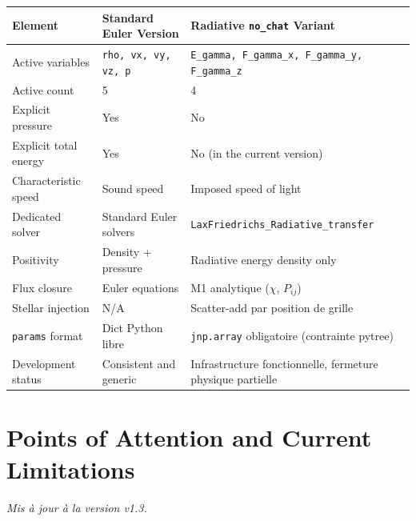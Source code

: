 \documentclass[a4paper, 11pt]{article}
\begin{document}
\begin{center}
\begin{tabular}{|l|l|l|}
\hline
\textbf{Element} & \textbf{Standard Euler Version} & \textbf{Radiative \texttt{no\_chat} Variant} \\
\hline
Active variables & \texttt{rho, vx, vy, vz, p} & \texttt{E\_gamma, F\_gamma\_x, F\_gamma\_y, F\_gamma\_z} \\
\hline
Active count & 5 & 4 \\
\hline
Explicit pressure & Yes & No \\
\hline
Explicit total energy & Yes & No (in the current version) \\
\hline
Characteristic speed & Sound speed & Imposed speed of light \\
\hline
Dedicated solver & Standard Euler solvers & \texttt{LaxFriedrichs\_Radiative\_transfer} \\
\hline
Positivity & Density + pressure & Radiative energy density only \\
\hline
Flux closure & Euler equations & M1 analytique ($\chi$, $P_{ij}$) \\
\hline
Stellar injection & N/A & Scatter-add par position de grille \\
\hline
\texttt{params} format & Dict Python libre & \texttt{jnp.array} obligatoire (contrainte pytree) \\
\hline
Development status & Consistent and generic & Infrastructure fonctionnelle, fermeture physique partielle \\
\hline
\end{tabular}
\end{center}

\section{Points of Attention and Current Limitations}

\textit{Mis à jour à la version v1.3.}
\end{document}
